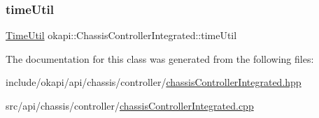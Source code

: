 \mbox{\label{classokapi_1_1ChassisControllerIntegrated_addd982f5928a19f17105409a96eaf419}} 
\subsubsection{\texorpdfstring{timeUtil}{timeUtil}}
{\footnotesize\ttfamily \mbox{\hyperlink{classokapi_1_1TimeUtil}{Time\+Util}} okapi\+::\+Chassis\+Controller\+Integrated\+::time\+Util\hspace{0.3cm}{\ttfamily [protected]}}



The documentation for this class was generated from the following files\+:\begin{DoxyCompactItemize}
\item 
include/okapi/api/chassis/controller/\mbox{\hyperlink{chassisControllerIntegrated_8hpp}{chassis\+Controller\+Integrated.\+hpp}}\item 
src/api/chassis/controller/\mbox{\hyperlink{chassisControllerIntegrated_8cpp}{chassis\+Controller\+Integrated.\+cpp}}\end{DoxyCompactItemize}
